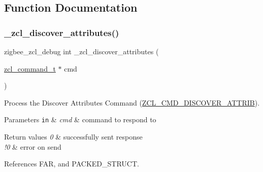 \subsection{Function Documentation}
\mbox{\label{group__zcl_ga385c41594437cdf661bfb518f11ee0fc}} 
\subsubsection{\texorpdfstring{\+\_\+zcl\+\_\+discover\+\_\+attributes()}{\_zcl\_discover\_attributes()}}
{\footnotesize\ttfamily zigbee\+\_\+zcl\+\_\+debug int \+\_\+zcl\+\_\+discover\+\_\+attributes (\begin{DoxyParamCaption}\item[{\hyperlink{structzcl__command__t}{zcl\+\_\+command\+\_\+t} $\ast$}]{cmd }\end{DoxyParamCaption})}



Process the Discover Attributes Command (\hyperlink{group__zcl_ga2919d6fc8068efac4c9969938a4b9ff5}{Z\+C\+L\+\_\+\+C\+M\+D\+\_\+\+D\+I\+S\+C\+O\+V\+E\+R\+\_\+\+A\+T\+T\+R\+IB}). 


\begin{DoxyParams}[1]{Parameters}
\mbox{\tt in}  & {\em cmd} & command to respond to\\
\hline
\end{DoxyParams}

\begin{DoxyRetVals}{Return values}
{\em 0} & successfully sent response \\
\hline
{\em !0} & error on send \\
\hline
\end{DoxyRetVals}


References F\+AR, and P\+A\+C\+K\+E\+D\+\_\+\+S\+T\+R\+U\+CT.

\mbox{\label{group__zcl_gaae79107724236347a5e22612869df2bf}} 
